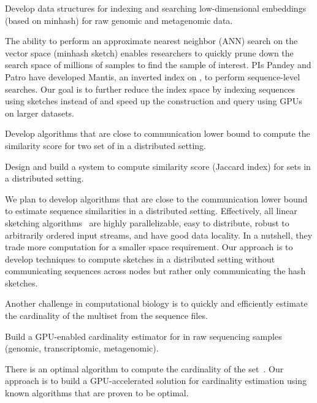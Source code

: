 \begin{rproblem}
Develop data structures for indexing and searching low-dimensional embeddings (based on minhash) for raw genomic and metagenomic data.
\end{rproblem}

The ability to perform an approximate nearest neighbor (ANN) search on the vector space (minhash sketch) enables researchers to quickly prune down the search space of millions of samples to find the sample of interest. PIs Pandey and Patro have developed Mantis, an inverted index on \kmers, to perform sequence-level searches. Our goal is to further reduce the index space by indexing sequences using sketches instead of \kmers and speed up the construction and query using GPUs on larger datasets.

\begin{rproblem}
Develop algorithms that are close to communication lower bound to compute the similarity score for two set of \kmers in a distributed setting.
\end{rproblem}

\begin{rproblem}
Design and build a system to compute similarity score (Jaccard index) for \kmer sets in a distributed setting.
\end{rproblem}

We plan to develop algorithms that are close to the communication lower bound to estimate sequence similarities in a distributed setting. Effectively, all linear sketching algorithms~\cite{li2014sketchuniversal} are highly parallelizable, easy to distribute, robust to arbitrarily ordered input streams, and have good data locality. In a nutshell, they trade more computation for a smaller space requirement. Our approach is to develop techniques to compute sketches in a distributed setting without communicating sequences across nodes but rather only communicating the hash sketches.

Another challenge in computational biology is to quickly and efficiently estimate the cardinality of the \kmer multiset from the sequence files. 


\begin{rproblem}
Build a GPU-enabled cardinality estimator for \kmers in raw sequencing samples (genomic, transcriptomic, metagenomic).
\end{rproblem}

There is an optimal algorithm to compute the cardinality of the set~\cite{Kane2010}.
Our approach is to build a GPU-accelerated solution for cardinality estimation using known algorithms that are proven to be optimal.

